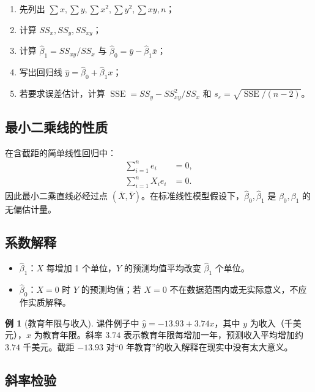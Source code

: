 \documentclass[11pt,a4paper]{article}
\theoremstyle{definition}
\newtheorem{example}{例}[section]
\theoremstyle{plain}
\theoremstyle{remark}
\begin{document}
\begin{methodbox}[手算最小二乘题]
\begin{enumerate}
    \item 先列出 $\sum x,\sum y,\sum x^2,\sum y^2,\sum xy,n$；
    \item 计算 $SS_x,SS_y,SS_{xy}$；
    \item 计算 $\hat\beta_1=SS_{xy}/SS_x$ 与 $\hat\beta_0=\bar y-\hat\beta_1\bar x$；
    \item 写出回归线 $\hat y=\hat\beta_0+\hat\beta_1x$；
    \item 若要求误差估计，计算 $\operatorname{SSE}=SS_y-SS_{xy}^2/SS_x$ 和 $s_\varepsilon=\sqrt{\operatorname{SSE}/(n-2)}$。
\end{enumerate}
\end{methodbox}

\subsection{最小二乘线的性质}

在含截距的简单线性回归中：
\begin{align}
    \sum_{i=1}^n e_i &=0,\\
    \sum_{i=1}^n X_i e_i&=0.
\end{align}
因此最小二乘直线必经过点 $(\bar X,\bar Y)$。在标准线性模型假设下，$\hat\beta_0,\hat\beta_1$ 是 $\beta_0,\beta_1$ 的无偏估计量。

\subsection{系数解释}

\begin{itemize}
    \item $\hat\beta_1$：$X$ 每增加 1 个单位，$Y$ 的预测均值平均改变 $\hat\beta_1$ 个单位。
    \item $\hat\beta_0$：$X=0$ 时 $Y$ 的预测均值；若 $X=0$ 不在数据范围内或无实际意义，不应作实质解释。
\end{itemize}

\begin{example}[教育年限与收入]
课件例子中 $\hat y=-13.93+3.74x$，其中 $y$ 为收入（千美元），$x$ 为教育年限。斜率 $3.74$ 表示教育年限每增加一年，预测收入平均增加约 $3.74$ 千美元。截距 $-13.93$ 对“0 年教育”的收入解释在现实中没有太大意义。
\end{example}

\subsection{斜率检验}
\end{document}
